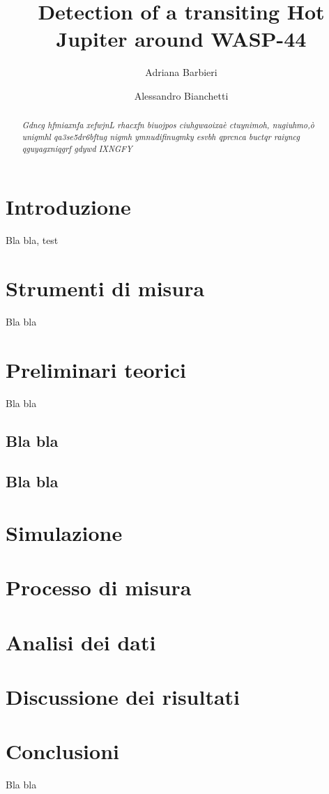 \documentclass[a4paper,11pt,twocolumn]{article}
\title{Detection of a transiting Hot Jupiter around WASP-44}
\author{Adriana Barbieri \and Alessandro Bianchetti}
\begin{document}
\maketitle

\begin{abstract}

\emph{Gdncg hfmiaxnfa   xefwjnL rhacxfn  biuojpos  ciuhgwaoixaè ctuynimoh, nugiuhmo,ò  unigmhl qa3se5dr6bftug nigmh ymnudifinugmky esvbh qprcnca buctqr  raiyncg  qguyagxniqgrf gdywd IXNGFY}

\end{abstract}

\section{Introduzione}

Bla bla, test


\section{Strumenti di misura}

Bla bla



\section{Preliminari teorici}

Bla bla




\subsection{Bla bla}



\subsection{Bla bla}



\section{Simulazione}



\section{Processo di misura}






\section{Analisi dei dati}





\section{Discussione dei risultati}



\section{Conclusioni}

Bla bla
\end{document}
